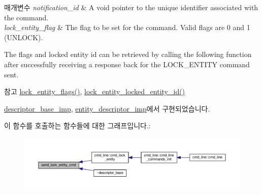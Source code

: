 \begin{DoxyParams}{매개변수}
{\em notification\+\_\+id} & A void pointer to the unique identifier associated with the command. \\
\hline
{\em lock\+\_\+entity\+\_\+flag} & The flag to be set for the command. Valid flags are 0 and 1 (U\+N\+L\+O\+CK).\\
\hline
\end{DoxyParams}
The flags and locked entity id can be retrieved by calling the following function after successfully receiving a response back for the L\+O\+C\+K\+\_\+\+E\+N\+T\+I\+TY command sent.

\begin{DoxySeeAlso}{참고}
\hyperlink{classavdecc__lib_1_1descriptor__base_a757e66272bba4c52cefa914df8c60bb5}{lock\+\_\+entity\+\_\+flags()}, \hyperlink{classavdecc__lib_1_1descriptor__base_a052b47529d0e60ca87894159fcb65e14}{lock\+\_\+entity\+\_\+locked\+\_\+entity\+\_\+id()} 
\end{DoxySeeAlso}


\hyperlink{classavdecc__lib_1_1descriptor__base__imp_a26fd66d8c409502eaa4dba47742ca7fa}{descriptor\+\_\+base\+\_\+imp}, \hyperlink{classavdecc__lib_1_1entity__descriptor__imp_a26fd66d8c409502eaa4dba47742ca7fa}{entity\+\_\+descriptor\+\_\+imp}에서 구현되었습니다.



이 함수를 호출하는 함수들에 대한 그래프입니다.\+:
\nopagebreak
\begin{figure}[H]
\begin{center}
\leavevmode
\includegraphics[width=350pt]{classavdecc__lib_1_1descriptor__base_a1ac1f5c700f4eebd37b7c45498b36bbc_icgraph}
\end{center}
\end{figure}


